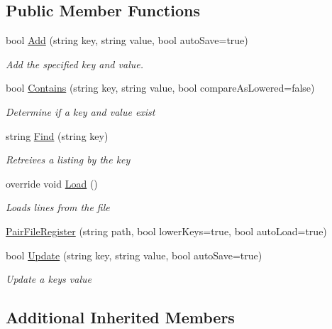 \subsection*{Public Member Functions}
\begin{DoxyCompactItemize}
\item 
bool \hyperlink{classOTA_1_1Misc_1_1PairFileRegister_a52c0d41415756aa1f51d039fe1c3dbc1}{Add} (string key, string value, bool auto\+Save=true)
\begin{DoxyCompactList}\small\item\em Add the specified key and value. \end{DoxyCompactList}\item 
bool \hyperlink{classOTA_1_1Misc_1_1PairFileRegister_aeb31996673898eedc12210f1bbc235ca}{Contains} (string key, string value, bool compare\+As\+Lowered=false)
\begin{DoxyCompactList}\small\item\em Determine if a key and value exist \end{DoxyCompactList}\item 
string \hyperlink{classOTA_1_1Misc_1_1PairFileRegister_a32283363e1effc193419ddb49b197e4c}{Find} (string key)
\begin{DoxyCompactList}\small\item\em Retreives a listing by the key \end{DoxyCompactList}\item 
override void \hyperlink{classOTA_1_1Misc_1_1PairFileRegister_a7169855eea6c71131eee16f9bf3937c3}{Load} ()
\begin{DoxyCompactList}\small\item\em Loads lines from the file \end{DoxyCompactList}\item 
\hyperlink{classOTA_1_1Misc_1_1PairFileRegister_a838e7992536110e77afa9621dbea3703}{Pair\+File\+Register} (string path, bool lower\+Keys=true, bool auto\+Load=true)
\item 
bool \hyperlink{classOTA_1_1Misc_1_1PairFileRegister_a2025111cf37c4ca3d589a763093896c3}{Update} (string key, string value, bool auto\+Save=true)
\begin{DoxyCompactList}\small\item\em Update a keys value \end{DoxyCompactList}\end{DoxyCompactItemize}
\subsection*{Additional Inherited Members}


